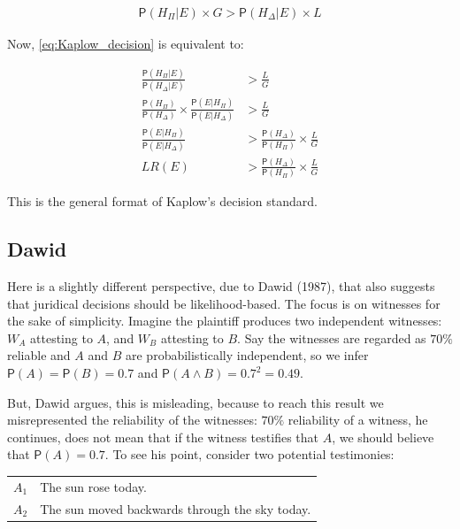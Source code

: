 \documentclass[10pt,dvipsnames,enabledeprecatedfontcommands]{scrartcl}
\newcommand{\et}{\wedge}
\newcommand{\pr}[1]{\mathsf{P}(#1)}
\begin{document}
\vspace{-6mm}

\begin{align}
\label{eq:Kaplow_decision}
\pr{H_\Pi\vert E}\times G > \pr{H_\Delta\vert E}\times L
\end{align}

\noindent Now, \eqref{eq:Kaplow_decision} is equivalent to:

\vspace{-6mm}

\begin{align}
\nonumber
\frac{\pr{H_\Pi \vert E}}{\pr{H_\Delta \vert E}} & > \frac{L}{G}\\
\nonumber
\frac{\pr{H_\Pi}}{\pr{H_\Delta}} \times \frac{\pr{E\vert H_\Pi}}{\pr{E\vert H_\Delta}} &> \frac{L}{G}\\
\nonumber
\frac{\pr{E\vert H_\Pi}}{\pr{E\vert H_\Delta}}  & > \frac{\pr{H_\Delta}}{\pr{H_\Pi}} \times \frac{L}{G}\\
\label{eq:Kaplow_decision2} LR(E)  & > \frac{\pr{H_\Delta}}{\pr{H_\Pi}} \times \frac{L}{G}
\end{align}

\noindent This is the general format of Kaplow's decision standard.

\subsection{Dawid}\label{dawid}

Here is a slightly different perspective, due to Dawid (1987), that also
suggests that juridical decisions should be likelihood-based. The focus
is on witnesses for the sake of simplicity. Imagine the plaintiff
produces two independent witnesses: \(W_A\) attesting to \(A\), and
\(W_B\) attesting to \(B\). Say the witnesses are regarded as \(70\%\)
reliable and \(A\) and \(B\) are probabilistically independent, so we
infer \(\pr{A}=\pr{B}=0.7\) and \(\pr{A\et B}=0.7^2=0.49\).

But, Dawid argues, this is misleading, because to reach this result we
misrepresented the reliability of the witnesses: \(70\%\) reliability of
a witness, he continues, does not mean that if the witness testifies
that \(A\), we should believe that \(\pr{A}=0.7\). To see his point,
consider two potential testimonies:

\begin{center}
\begin{tabular}
{@{}ll@{}}
\toprule
  $A_1$ & The sun rose today. \\
   $A_2$ & The sun moved backwards through the sky today.\\
\bottomrule
\end{tabular}
\end{center}
\end{document}
